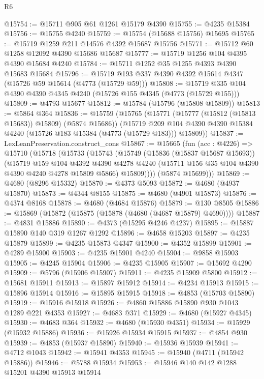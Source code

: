 \begin{lexlean}{R6}
\begin{coremodule}
@15754 := @15711 @905 @61 @1261 @15179 @4390
@15755 := @4235 @15384
@15756 := @15755 @4240
@15759 := @15754 (@15688 @15756) @15695
@15765 := @15719 @1259 @211 @14576 @4392 @15687 @15756
@15771 := @15712 @60 @1258 @12092 @4390 @15686 @15687
@15777 := @15719 @1256 @104 @4395 @4390 @15684 @4240
@15784 := @15711 @1252 @35 @1255 @4393 @4390 @15683 @15684
@15796 := @15719 @193 @337 @4390 @4392 @15614 @4347 (@15726 @59 @15614 (@4773 (@15729 @59)))
@15808 := @15719 @335 @104 @4390 @4390 @4345 @4240 (@15726 @155 @4345 (@4773 (@15729 @155)))
@15809 := @4793 @15677
@15812 := @15784 (@15796 (@15808 @15809))
@15813 := @5864 @364
@15836 := @15759
    (@15765
      (@15771 (@15777 (@15812 (@15813 @15683)) @15809) (@5874 @15686))
      (@15719 @209 @104 @4390 @4390 @15384 @4240 (@15726 @183 @15384 (@4773 (@15729 @183))) @15809))
@15837 := LexLeanPreservation.construct_cons
@15867 := @15665
    (fun (acc : @4226) =>
    @15710
      (@15718
        (@15733
          (@15743
            (@15749
              (@15836 (@15837 @15687 @15693))
              (@15719
                @159
                @104
                @4392
                @4390
                @4278
                @4240
                (@15711 @156 @35 @104 @4390 @4390 @4240 @4278 @15809 @5866)
                @15809))))
        (@5874 @15699)))
@15869 := @4680 (@8296 @15332)
@15870 := @4373 @5093
@15872 := @4680 (@4937 @15870)
@15873 := @4344 @8155
@15875 := @4680 (@4901 @15873)
@15876 := @4374 @8168
@15878 := @4680 (@4684 @15876)
@15879 := @130 @8505
@15886 := @15869 (@15872 (@15875 (@15878 (@4680 (@4687 @15879) @4690))))
@15887 := @4831 @15886
@15890 := @4373 (@15295 @4246 @4237)
@15895 := @15887 @15890 @140 @319 @1267 @1292
@15896 := @4658 @15203
@15897 := @4235 @15879
@15899 := @4235 @15873 @4347
@15900 := @4352 @15899
@15901 := @4289 @15900
@15903 := @4235 @15901 @4240
@15904 := @9858 @15903
@15905 := @4245 @15904
@15906 := @4235 @15905
@15907 := @15692 @4290
@15909 := @5796 (@15906 @15907)
@15911 := @4235 @15909 @5800
@15912 := @15681 @15911
@15913 := @15897 @15912
@15914 := @4234 @15913
@15915 := @15896 @15914
@15916 := @15895 @15915
@15918 := @4853 (@15703 @15890)
@15919 := @15916 @15918
@15926 := @4860 @15886 @15890 @930 @1043 @1289 @221 @4353
@15927 := @4683 @371
@15929 := @4680 (@15927 @4345)
@15930 := @4683 @364
@15932 := @4680 (@15930 @4351)
@15934 := @15929 (@15932 @15886)
@15936 := @15926 @15934 @15915
@15937 := @4854 @930
@15939 := @4853 (@15937 @15890)
@15940 := @15936 @15939
@15941 := @4712 @1043
@15942 := @15941 @4353
@15945 := @15940 (@4711 (@15942 @15886))
@15946 := @5788 @15934
@15953 := @15946 @140 @142 @1288 @15201 @4390 @15913 @15914

\end{coremodule}
\end{lexlean}
